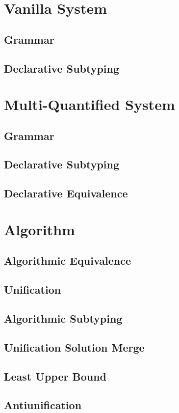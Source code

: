 \documentclass[a4,natbib=false]{article}
\begin{document}
\section{Vanilla System}
\subsection{Grammar}
\ottgrammartabular{
  \ottP\ottinterrule
  \ottN\ottinterrule
}
\subsection{Declarative Subtyping}
\ottdefnsDZero

\section{Multi-Quantified System}
\subsection{Grammar}
\ottgrammartabular{
  \ottiP\ottinterrule
  \ottiN\ottinterrule
}
\subsection{Declarative Subtyping}
\ottdefnsDOne




\subsection{Declarative Equivalence}
\ottdefnsEOne


\section{Algorithm}
\subsection{Algorithmic Equivalence}
\ottdefnsEOneA

\subsection{Unification}
\ottdefnsU

\subsection{Algorithmic Subtyping}
\ottdefnsA

\subsection{Unification Solution Merge}
\ottdefnsSM

\subsection{Least Upper Bound}
\ottdefnsLUB

\subsection{Antiunification}
\ottdefnsAU





% 
% 
\end{document}
